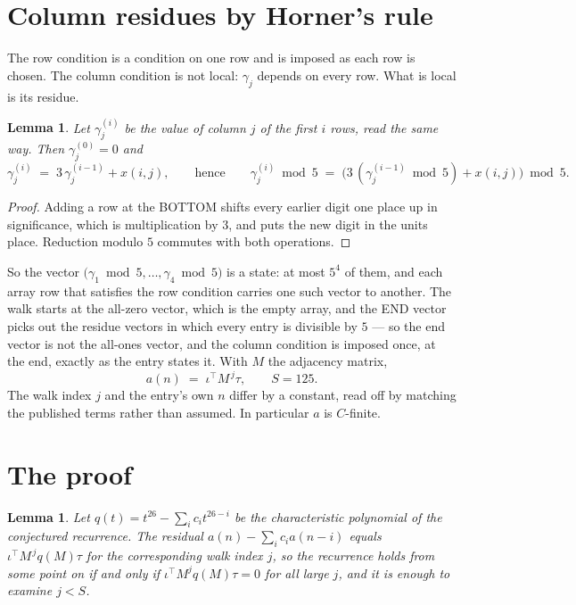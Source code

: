 \documentclass[11pt,a4paper]{article}
\theoremstyle{plain}
\newtheorem{lemma}[theorem]{Lemma}
\theoremstyle{definition}
\begin{document}
\section{Column residues by Horner's rule}

The row condition is a condition on one row and is imposed as each row is chosen. The column
condition is not local: $\gamma_j$ depends on every row. What is local is its residue.

\begin{lemma}\label{lem:horner}
Let $\gamma_j^{(i)}$ be the value of column $j$ of the first $i$ rows, read the same way.
Then $\gamma_j^{(0)}=0$ and
\[
\gamma_j^{(i)}\;=\;3\,\gamma_j^{(i-1)}+x(i,j),
\qquad\text{hence}\qquad
\gamma_j^{(i)}\bmod 5\;=\;
\bigl(3\,(\gamma_j^{(i-1)}\bmod 5)+x(i,j)\bigr)\bmod 5 .
\]
\end{lemma}

\begin{proof}
Adding a row at the BOTTOM shifts every earlier digit one place up in significance, which is
multiplication by $3$, and puts the new digit in the units place. Reduction modulo
$5$ commutes with both operations.
\end{proof}

So the vector $\bigl(\gamma_1\bmod 5,\dots,\gamma_{4}\bmod
5\bigr)$ is a state: at most $5^{4}$ of them, and each array row
that satisfies the row condition carries one such vector to another. The walk starts at the
all-zero vector, which is the empty array, and the END vector picks out the residue vectors in
which every entry is divisible by $5$ --- so the end vector is not the all-ones
vector, and the column condition is imposed once, at the end, exactly as the entry states it.
With $M$ the adjacency matrix,
\[
a(n)\;=\;\iota^{\!\top}M^{\,j}\tau ,\qquad S=125.
\]
The walk index $j$ and the entry's own $n$ differ by a constant, read off by matching the
published terms rather than assumed. In particular $a$ is $C$-finite.

\section{The proof}

\begin{lemma}\label{lem:crit}
Let $q(t)=t^{26}-\sum_i c_it^{26-i}$ be the characteristic polynomial of the
conjectured recurrence. The residual $a(n)-\sum_ic_ia(n-i)$ equals
$\iota^{\!\top}M^{\,j}q(M)\tau$ for the corresponding walk index $j$, so the recurrence
holds from some point on if and only if $\iota^{\!\top}M^{j}q(M)\tau=0$ for all large $j$,
and it is enough to examine $j<S$.
\end{lemma}
\end{document}
